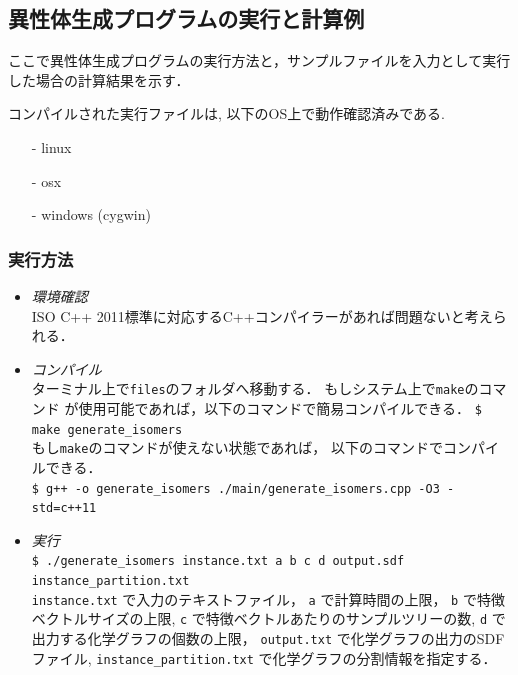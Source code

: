 \documentclass[11pt,titlepage,dvipdfmx,twoside]{jsbook}
\begin{document}
\bigskip




\subsection{異性体生成プログラムの実行と計算例}
\label{chap:Example_m}

ここで異性体生成プログラムの実行方法と，サンプルファイルを入力として実行した場合の計算結果を示す．


コンパイルされた実行ファイルは, 以下のOS上で動作確認済みである.
\begin{itemize}
\item[-] linux
\item[-] osx 
\item[-] windows (cygwin)
\end{itemize}


\subsubsection{実行方法}
\label{chap:compile_m}
\begin{itemize}
	\item {\em 環境確認}\\
		ISO C++ 2011標準に対応するC++コンパイラーがあれば問題ないと考えられる．
	\item {\em コンパイル}\\
	
	      ターミナル上で{\tt files}のフォルダへ移動する．
	      もしシステム上で{\tt make}のコマンド
	      が使用可能であれば，以下のコマンドで簡易コンパイルできる．
	      \verb|$ make generate_isomers|\\
	      もし{\tt make}のコマンドが使えない状態であれば，
	      以下のコマンドでコンパイルできる． \\  
		\verb|$ g++ -o generate_isomers ./main/generate_isomers.cpp -O3 -std=c++11| 
	\item {\em 実行}\\
		\verb|$ ./generate_isomers instance.txt a b c d output.sdf instance_partition.txt|\\
		\verb|instance.txt| で入力のテキストファイル，
		\verb|a| で計算時間の上限，
		\verb|b| で特徴ベクトルサイズの上限,
		\verb|c| で特徴ベクトルあたりのサンプルツリーの数,
		\verb|d| で出力する化学グラフの個数の上限，
		\verb|output.txt| で化学グラフの出力のSDFファイル,
		\verb|instance_partition.txt| で化学グラフの分割情報を指定する．
\end{itemize}
\end{document}
